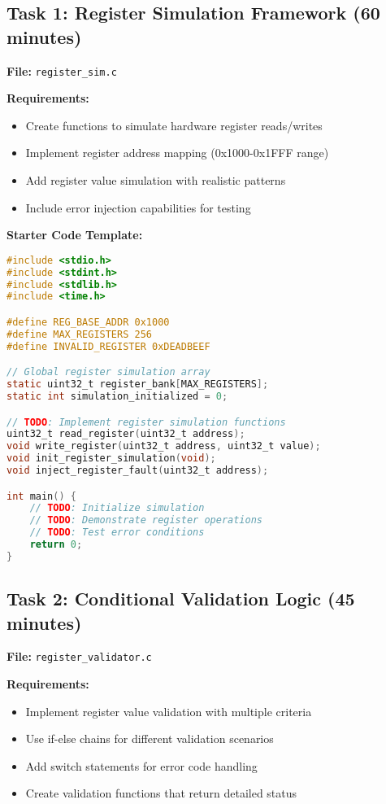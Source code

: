 \documentclass[11pt,a4paper]{article}
\begin{document}
\subsection{Task 1: Register Simulation Framework (60 minutes)}

\textbf{File:} \texttt{register\_sim.c}

\textbf{Requirements:}
\begin{itemize}
    \item Create functions to simulate hardware register reads/writes
    \item Implement register address mapping (0x1000-0x1FFF range)
    \item Add register value simulation with realistic patterns
    \item Include error injection capabilities for testing
\end{itemize}

\textbf{Starter Code Template:}
\begin{lstlisting}[language=C]
#include <stdio.h>
#include <stdint.h>
#include <stdlib.h>
#include <time.h>

#define REG_BASE_ADDR 0x1000
#define MAX_REGISTERS 256
#define INVALID_REGISTER 0xDEADBEEF

// Global register simulation array
static uint32_t register_bank[MAX_REGISTERS];
static int simulation_initialized = 0;

// TODO: Implement register simulation functions
uint32_t read_register(uint32_t address);
void write_register(uint32_t address, uint32_t value);
void init_register_simulation(void);
void inject_register_fault(uint32_t address);

int main() {
    // TODO: Initialize simulation
    // TODO: Demonstrate register operations
    // TODO: Test error conditions
    return 0;
}
\end{lstlisting}

\subsection{Task 2: Conditional Validation Logic (45 minutes)}

\textbf{File:} \texttt{register\_validator.c}

\textbf{Requirements:}
\begin{itemize}
    \item Implement register value validation with multiple criteria
    \item Use if-else chains for different validation scenarios
    \item Add switch statements for error code handling
    \item Create validation functions that return detailed status
\end{itemize}
\end{document}
